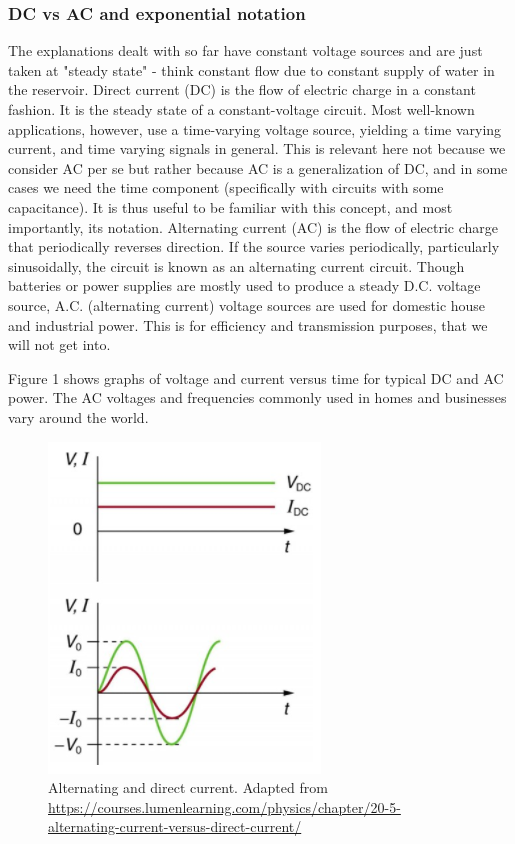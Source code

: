 \subsubsection{DC vs AC and exponential notation}

The explanations dealt with so far have constant voltage sources and are just taken at "steady state" - think constant flow due to constant supply of water in the reservoir. Direct current (DC) is the flow of electric charge in a constant fashion. It is the steady state of a constant-voltage circuit. Most well-known applications, however, use a time-varying voltage source, yielding a time varying current, and time varying signals in general. This is relevant here not because we consider AC per se but rather because AC is a generalization of DC, and in some cases we need the time component (specifically with circuits with some capacitance). It is thus useful to be familiar with this concept, and most importantly, its notation. Alternating current (AC) is the flow of electric charge that periodically reverses direction. If the source varies periodically, particularly sinusoidally, the circuit is known as an alternating current circuit. Though batteries or power supplies are mostly used to produce a steady D.C. voltage source, A.C. (alternating current) voltage sources are used for domestic house and industrial power. This is for efficiency and transmission purposes, that we will not get into.

Figure 1 shows graphs of voltage and current versus time for typical DC and AC power. The AC voltages and frequencies commonly used in homes and businesses vary around the world. 

\begin{figure}[H]
    \centering
    \includegraphics[width=0.35\linewidth]{../../Figures/ACDC.PNG}
    \caption{Alternating and direct current. Adapted from \url{https://courses.lumenlearning.com/physics/chapter/20-5-alternating-current-versus-direct-current/}}
    \label{fig:ACDC}
\end{figure}

